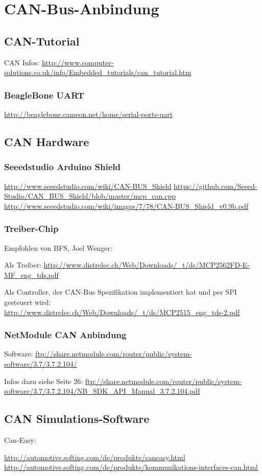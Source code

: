 \chapter{CAN-Bus-Anbindung}
\label{chap:canbusanbindung}

\section{CAN-Tutorial}
CAN Infos: \url{http://www.computer-solutions.co.uk/info/Embedded_tutorials/can_tutorial.htm}

\subsection{BeagleBone UART}
\url{http://beaglebone.cameon.net/home/serial-ports-uart}


\section{CAN Hardware}
\subsection{Seeedstudio Arduino Shield}
\url{http://www.seeedstudio.com/wiki/CAN-BUS_Shield}
\url{https://github.com/Seeed-Studio/CAN_BUS_Shield/blob/master/mcp_can.cpp}
\url{http://www.seeedstudio.com/wiki/images/7/78/CAN-BUS_Shield_v0.9b.pdf}

\subsection{Treiber-Chip}
Empfohlen von BFS, Joel Wenger:

Als Treiber: \url{http://www.distrelec.ch/Web/Downloads/_t/ds/MCP2562FD-E-MF_eng_tds.pdf}

Als Controller, der CAN-Bus Spezifikation implementiert hat und per SPI gesteuert wird: \url{http://www.distrelec.ch/Web/Downloads/_t/ds/MCP2515_eng_tds-2.pdf}

\subsection{NetModule CAN Anbindung}
Software: \url{ftp://share.netmodule.com/router/public/system-software/3.7/3.7.2.104/}

Infos dazu siehe Seite 26: \url{ftp://share.netmodule.com/router/public/system-software/3.7/3.7.2.104/NB_SDK_API_Manual_3.7.2.104.pdf}

\section{CAN Simulations-Software}
Can-Easy:

\url{http://automotive.softing.com/de/produkte/caneasy.html}
\url{http://automotive.softing.com/de/produkte/kommunikations-interfaces-can.html}


